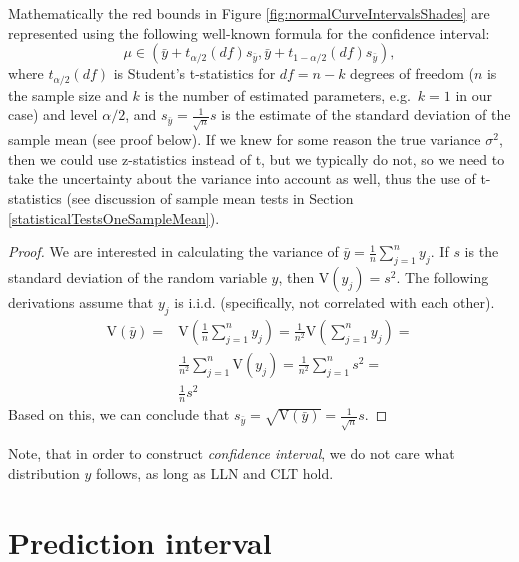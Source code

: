 \documentclass[
]{book}
\theoremstyle{definition}
\theoremstyle{definition}
\theoremstyle{definition}
\theoremstyle{definition}
\theoremstyle{remark}
\begin{document}
Mathematically the red bounds in Figure \ref{fig:normalCurveIntervalsShades} are represented using the following well-known formula for the confidence interval:
\begin{equation}
    \mu \in (\bar{y} + t_{\alpha/2}(df) s_{\bar{y}}, \bar{y} + t_{1-\alpha/2}(df) s_{\bar{y}}),
    \label{eq:confidenceInterval}
\end{equation}
where \(t_{\alpha/2}(df)\) is Student's t-statistics for \(df=n-k\) degrees of freedom (\(n\) is the sample size and \(k\) is the number of estimated parameters, e.g.~\(k=1\) in our case) and level \(\alpha/2\), and \(s_{\bar{y}}=\frac{1}{\sqrt{n}}s\) is the estimate of the standard deviation of the sample mean (see proof below). If we knew for some reason the true variance \(\sigma^2\), then we could use z-statistics instead of t, but we typically do not, so we need to take the uncertainty about the variance into account as well, thus the use of t-statistics (see discussion of sample mean tests in Section \ref{statisticalTestsOneSampleMean}).

\begin{proof}
We are interested in calculating the variance of \(\bar{y}=\frac{1}{n} \sum_{j=1}^n y_j\). If \(s\) is the standard deviation of the random variable \(y\), then \(\mathrm{V}(y_j) = s^2\). The following derivations assume that \(y_j\) is i.i.d. (specifically, not correlated with each other).
\begin{equation*}
    \begin{aligned}
    \mathrm{V}(\bar{y}) = & \mathrm{V}\left(\frac{1}{n} \sum_{j=1}^n y_j \right) = \frac{1}{n^2} \mathrm{V} \left(\sum_{j=1}^n y_j \right) = \\
                          & \frac{1}{n^2} \sum_{j=1}^n \mathrm{V} \left( y_j \right) = \frac{1}{n^2} \sum_{j=1}^n s^2 = \\
                          & \frac{1}{n} s^2
    \end{aligned}
\end{equation*}
Based on this, we can conclude that \(s_{\bar{y}}=\sqrt{\mathrm{V}(\bar{y})}= \frac{1}{\sqrt{n}} s\).
\end{proof}

Note, that in order to construct \emph{confidence interval}, we do not care what distribution \(y\) follows, as long as LLN and CLT hold.

\hypertarget{confidenceIntervalsPrediction}{%
\section{Prediction interval}\label{confidenceIntervalsPrediction}}
\end{document}
